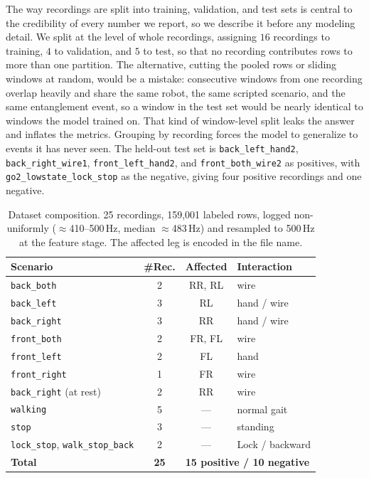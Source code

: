 \documentclass[conference]{IEEEtran}
\begin{document}
The way recordings are split into training, validation, and test sets is central to the credibility of every number we report, so we describe it before any modeling detail. We split at the level of whole recordings, assigning $16$ recordings to training, $4$ to validation, and $5$ to test, so that no recording contributes rows to more than one partition. The alternative, cutting the pooled rows or sliding windows at random, would be a mistake: consecutive windows from one recording overlap heavily and share the same robot, the same scripted scenario, and the same entanglement event, so a window in the test set would be nearly identical to windows the model trained on. That kind of window-level split leaks the answer and inflates the metrics. Grouping by recording forces the model to generalize to events it has never seen. The held-out test set is \texttt{back\_left\_hand2}, \texttt{back\_right\_wire1}, \texttt{front\_left\_hand2}, and \texttt{front\_both\_wire2} as positives, with \texttt{go2\_lowstate\_lock\_stop} as the negative, giving four positive recordings and one negative.
\begin{table}[t]
\centering
\caption{Dataset composition. 25 recordings, 159{,}001 labeled rows, logged non-uniformly
($\approx$410--500\,Hz, median $\approx$483\,Hz) and resampled to 500\,Hz at the feature stage. The
affected leg is encoded in the file name.}
\label{tab:dataset}
\footnotesize
\begin{tabular}{@{}lccl@{}}
\toprule
Scenario & \#Rec. & Affected & Interaction \\
\midrule
\texttt{back\_both}  & 2 & RR, RL & wire \\
\texttt{back\_left}  & 3 & RL     & hand / wire \\
\texttt{back\_right} & 3 & RR     & hand / wire \\
\texttt{front\_both} & 2 & FR, FL & wire \\
\texttt{front\_left} & 2 & FL     & hand \\
\texttt{front\_right}& 1 & FR     & wire \\
\texttt{back\_right} (at rest) & 2 & RR & wire \\
\midrule
\texttt{walking} & 5 & --- & normal gait \\
\texttt{stop}    & 3 & --- & standing \\
\texttt{lock\_stop}, \texttt{walk\_stop\_back} & 2 & --- & Lock / backward \\
\midrule
\textbf{Total} & \textbf{25} & \multicolumn{2}{l}{\textbf{15 positive / 10 negative}} \\
\bottomrule
\end{tabular}
\end{table}
\end{document}
